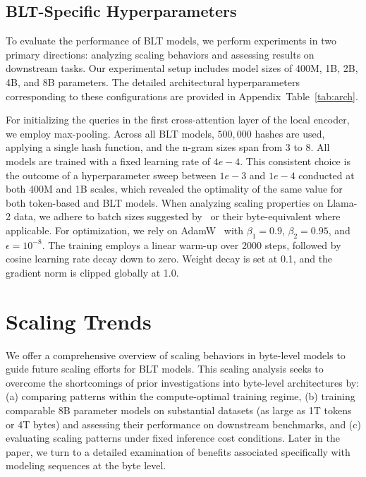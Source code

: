 \subsection{{\textsc BLT}-Specific Hyperparameters} 

To evaluate the performance of {\textsc BLT} models, we perform experiments in two primary directions: analyzing scaling behaviors and assessing results on downstream tasks. Our experimental setup includes model sizes of 400M, 1B, 2B, 4B, and 8B parameters. The detailed architectural hyperparameters corresponding to these configurations are provided in Appendix~Table~\ref{tab:arch}. 

For initializing the queries in the first cross-attention layer of the local encoder, we employ max-pooling. Across all {\textsc BLT} models, $500,000$ hashes are used, applying a single hash function, and the n-gram sizes span from 3 to 8. All models are trained with a fixed learning rate of $4e-4$. This consistent choice is the outcome of a hyperparameter sweep between $1e-3$ and $1e-4$ conducted at both 400M and 1B scales, which revealed the optimality of the same value for both token-based and {\textsc BLT} models. When analyzing scaling properties on Llama-2 data, we adhere to batch sizes suggested by~\cite{dubey2024llama} or their byte-equivalent where applicable. For optimization, we rely on AdamW~\citep{adamw} with $\beta_1 = 0.9$, $\beta_2 = 0.95$, and $\epsilon=10^{-8}$. The training employs a linear warm-up over 2000 steps, followed by cosine learning rate decay down to zero. Weight decay is set at 0.1, and the gradient norm is clipped globally at 1.0.

\section{Scaling Trends}
\label{section:scaling}

We offer a comprehensive overview of scaling behaviors in byte-level models to guide future scaling efforts for {\textsc BLT} models. This scaling analysis seeks to overcome the shortcomings of prior investigations into byte-level architectures by: (a) comparing patterns within the compute-optimal training regime, (b) training comparable 8B parameter models on substantial datasets (as large as 1T tokens or 4T bytes) and assessing their performance on downstream benchmarks, and (c) evaluating scaling patterns under fixed inference cost conditions. Later in the paper, we turn to a detailed examination of benefits associated specifically with modeling sequences at the byte level.


